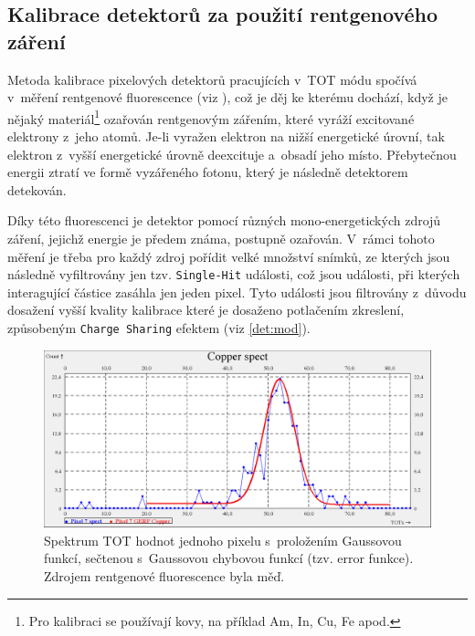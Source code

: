 \subsection{Kalibrace detektorů za použití rentgenového záření}\label{calib:xray}
Metoda kalibrace pixelových detektorů pracujících v~TOT módu \cite{Jakubek2011S262} spočívá v~měření rentgenové fluorescence (viz \cite{Jakubek-radiography_and_charge_sharing}),
což je děj ke kterému dochází, když je nějaký materiál\footnote{Pro kalibraci se používají kovy, na příklad Am, In, Cu, Fe apod.}
ozařován rentgenovým zářením, které vyráží excitované elektrony z~jeho atomů. Je-li vyražen elektron na nižší energetické úrovní, tak elektron z~vyšší energetické úrovně deexcituje a~obsadí jeho místo. Přebytečnou energii ztratí ve formě vyzářeného fotonu, který je následně detektorem detekován. 

Díky této fluorescenci je detektor pomocí různých mono-energetických zdrojů záření, jejichž energie je předem známa, postupně ozařován. V~rámci tohoto měření je třeba pro každý zdroj pořídit velké množství snímků, ze kterých jsou následně vyfiltrovány jen tzv. \texttt{Single-Hit} události, což jsou události, při kterých interagující částice zasáhla jen jeden pixel. Tyto události jsou filtrovány z~důvodu dosažení vyšší kvality kalibrace které je dosaženo potlačením zkreslení, způsobeným \texttt{Charge Sharing} efektem (viz \ref{det:mod}).

\begin{figure}[th]
	\begin{center}
		\includegraphics[width=14cm]{figures/calib_gerf.png}
		\caption{Spektrum TOT hodnot jednoho pixelu s~proložením Gaussovou funkcí, sečtenou s~Gaussovou chybovou funkcí (tzv. error funkce). Zdrojem rentgenové fluorescence byla měď.}
		\label{fig:calib:gerf}
	\end{center}
\end{figure}

